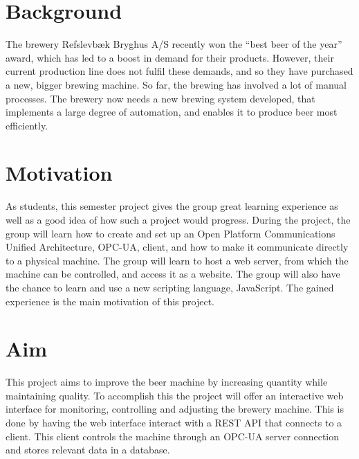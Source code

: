 \section{Background}
The brewery Refslevbæk Bryghus A/S recently won the “best beer of the year” 
award, which has led to a boost in demand for their products. However, their 
current production line does not fulfil these demands, and so they have 
purchased a new, bigger brewing machine. So far, the brewing has involved a lot 
of manual processes. The brewery now needs a new brewing system developed, that 
implements a large degree of automation, and enables it to produce beer most
efficiently.

\section{Motivation}
As students, this semester project gives the group great learning experience as
well as a good idea of how such a project would progress. During the project,
the group will learn how to create and set up an Open Platform Communications
Unified Architecture, OPC-UA, client, and how to make it communicate directly
to a physical machine. The group will learn to host a web server, from which the
machine can be controlled, and access it as a website. The group will also have
the chance to learn and use a new scripting language, JavaScript. The gained
experience is the main motivation of this project.

\section{Aim}
This project aims to improve the beer machine by increasing quantity while 
maintaining quality. To accomplish this the project will offer an interactive 
web interface for monitoring, controlling and adjusting the brewery machine. 
This is done by having the web interface interact with a REST API that connects 
to a client. This client controls the machine through an OPC-UA server 
connection and stores relevant data in a database.



